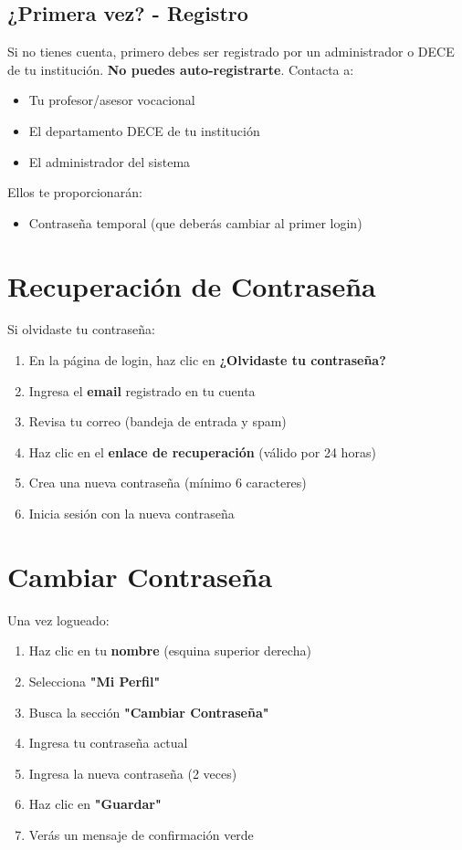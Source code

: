 \documentclass[12pt, a4paper]{report}
\begin{document}
\subsection{¿Primera vez? - Registro}
Si no tienes cuenta, primero debes ser registrado por un administrador o DECE de tu institución. \textbf{No puedes auto-registrarte}. Contacta a:
\begin{itemize}
    \item Tu profesor/asesor vocacional
    \item El departamento DECE de tu institución
    \item El administrador del sistema
\end{itemize}

Ellos te proporcionarán:
\begin{itemize}
    \itemUsuario (generalmente tu número de cédula)
    \item Contraseña temporal (que deberás cambiar al primer login)
\end{itemize}

\section{Recuperación de Contraseña}
Si olvidaste tu contraseña:
\begin{enumerate}
    \item En la página de login, haz clic en \textbf{¿Olvidaste tu contraseña?}
    \item Ingresa el \textbf{email} registrado en tu cuenta
    \item Revisa tu correo (bandeja de entrada y spam)
    \item Haz clic en el \textbf{enlace de recuperación} (válido por 24 horas)
    \item Crea una nueva contraseña (mínimo 6 caracteres)
    \item Inicia sesión con la nueva contraseña
\end{enumerate}

\section{Cambiar Contraseña}
Una vez logueado:
\begin{enumerate}
    \item Haz clic en tu \textbf{nombre} (esquina superior derecha)
    \item Selecciona \textbf{"Mi Perfil"}
    \item Busca la sección \textbf{"Cambiar Contraseña"}
    \item Ingresa tu contraseña actual
    \item Ingresa la nueva contraseña (2 veces)
    \item Haz clic en \textbf{"Guardar"}
    \item Verás un mensaje de confirmación verde
\end{enumerate}
\end{document}
